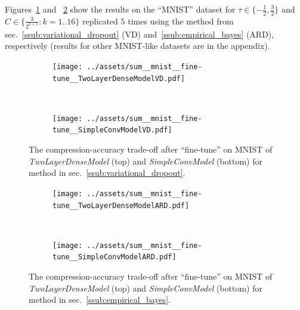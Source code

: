 \documentclass[a4paper,10pt]{article}
\begin{document}
Figures~\ref{fig:mnist-like__trade-off__vd} and ~\ref{fig:mnist-like__trade-off__ard} show
the results on the ``MNIST'' dataset for $\tau\in\{-\tfrac12, \tfrac32\}$ and $
  C \in \{\tfrac3{2^{k+1}}\colon k=1..16\}
$ replicated $5$ times using the method from sec.~\ref{ssub:variational_dropout} (VD)
and~\ref{ssub:empirical_bayes} (ARD), respectively (results for other MNIST-like datasets
are in the appendix).


\begin{figure}[!ht]
  \centering
  \begin{subfigure}[b]{0.95\textwidth}  %
    \centering
    \texttt{[image: ../assets/sum\_\_mnist\_\_fine-tune\_\_TwoLayerDenseModelVD.pdf]}
  \end{subfigure} \\%
  \begin{subfigure}[b]{0.95\textwidth}  %
    \centering
    \texttt{[image: ../assets/sum\_\_mnist\_\_fine-tune\_\_SimpleConvModelVD.pdf]}
  \end{subfigure}
  \caption{%
    The compression-accuracy trade-off after ``fine-tune'' on MNIST of \textit{TwoLayerDenseModel}
    (top) and \textit{SimpleConvModel} (bottom) for method in sec.~\ref{ssub:variational_dropout}.
  }
  \label{fig:mnist-like__trade-off__vd}
\end{figure}

\begin{figure}[!ht]
  \centering
  \begin{subfigure}[b]{0.95\textwidth}  %
    \centering
    \texttt{[image: ../assets/sum\_\_mnist\_\_fine-tune\_\_TwoLayerDenseModelARD.pdf]}
  \end{subfigure} \\%
  \begin{subfigure}[b]{0.95\textwidth}  %
    \centering
    \texttt{[image: ../assets/sum\_\_mnist\_\_fine-tune\_\_SimpleConvModelARD.pdf]}
  \end{subfigure}
  \caption{%
    The compression-accuracy trade-off after ``fine-tune'' on MNIST of \textit{TwoLayerDenseModel}
    (top) and \textit{SimpleConvModel} (bottom) for method in sec.~\ref{ssub:empirical_bayes}.
  }
  \label{fig:mnist-like__trade-off__ard}
\end{figure}
\end{document}
